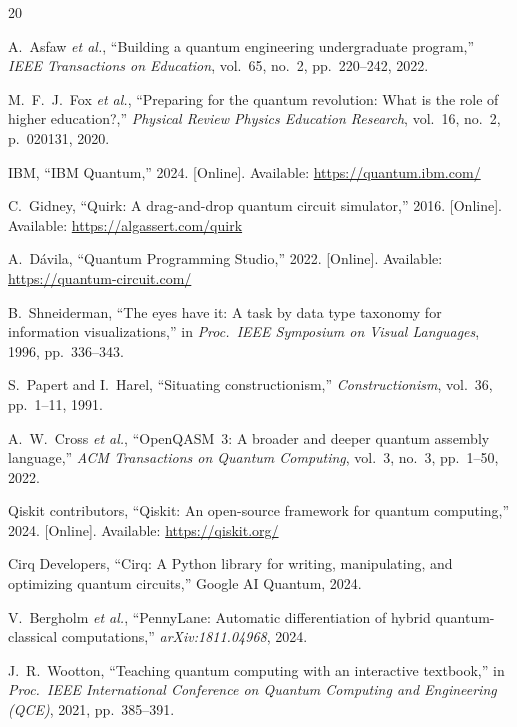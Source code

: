 \documentclass[conference]{IEEEtran}
\begin{document}
\begin{thebibliography}{20}

A.~Asfaw \emph{et al.}, ``Building a quantum engineering undergraduate program,'' \emph{IEEE Transactions on Education}, vol.~65, no.~2, pp.~220--242, 2022.

M.~F.~J.~Fox \emph{et al.}, ``Preparing for the quantum revolution: What is the role of higher education?,'' \emph{Physical Review Physics Education Research}, vol.~16, no.~2, p.~020131, 2020.

IBM, ``IBM Quantum,'' 2024. [Online]. Available: \url{https://quantum.ibm.com/}

C.~Gidney, ``Quirk: A drag-and-drop quantum circuit simulator,'' 2016. [Online]. Available: \url{https://algassert.com/quirk}

A.~D\'{a}vila, ``Quantum Programming Studio,'' 2022. [Online]. Available: \url{https://quantum-circuit.com/}

B.~Shneiderman, ``The eyes have it: A task by data type taxonomy for information visualizations,'' in \emph{Proc.\ IEEE Symposium on Visual Languages}, 1996, pp.~336--343.

S.~Papert and I.~Harel, ``Situating constructionism,'' \emph{Constructionism}, vol.~36, pp.~1--11, 1991.

A.~W.~Cross \emph{et al.}, ``OpenQASM~3: A broader and deeper quantum assembly language,'' \emph{ACM Transactions on Quantum Computing}, vol.~3, no.~3, pp.~1--50, 2022.

Qiskit contributors, ``Qiskit: An open-source framework for quantum computing,'' 2024. [Online]. Available: \url{https://qiskit.org/}

Cirq Developers, ``Cirq: A Python library for writing, manipulating, and optimizing quantum circuits,'' Google AI Quantum, 2024.

V.~Bergholm \emph{et al.}, ``PennyLane: Automatic differentiation of hybrid quantum-classical computations,'' \emph{arXiv:1811.04968}, 2024.

J.~R.~Wootton, ``Teaching quantum computing with an interactive textbook,'' in \emph{Proc.\ IEEE International Conference on Quantum Computing and Engineering (QCE)}, 2021, pp.~385--391.


\end{thebibliography}
\end{document}
